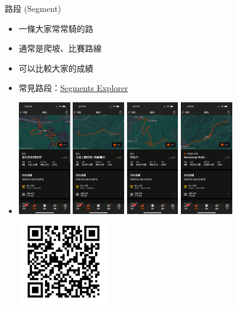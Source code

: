 \begin{frame}{路段 (Segment)}
\begin{itemize}
\item 一條大家常常騎的路
\item 通常是爬坡、比賽路線
\item 可以比較大家的成績
\item 常見路段：\href{https://brianhsu7476.github.io/segmentsExplorer/}{Segments Explorer}
\item \includegraphics[height=5cm]{maokongSegment.png}
\includegraphics[height=5cm]{coffeeSegment.png}
\includegraphics[height=5cm]{balakaSegment.png}
\includegraphics[height=5cm]{wulingSegment.png}
\includegraphics[height=4cm]{segmentsExplorer.png}
\end{itemize}
\end{frame}

